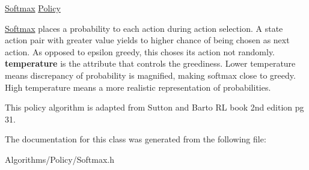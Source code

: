 \hyperlink{classAI_1_1Algorithm_1_1Softmax}{Softmax} \hyperlink{classAI_1_1Algorithm_1_1Policy}{Policy} 

\hyperlink{classAI_1_1Algorithm_1_1Softmax}{Softmax} places a probability to each action during action selection. A state action pair with greater value yields to higher chance of being chosen as next action. As opposed to epsilon greedy, this choses its action not randomly. {\bfseries temperature} is the attribute that controls the greediness. Lower temperature means discrepancy of probability is magnified, making softmax close to greedy. High temperature means a more realistic representation of probabilities. 

This policy algorithm is adapted from Sutton and Barto R\-L book 2nd edition pg 31. 

The documentation for this class was generated from the following file\-:\begin{DoxyCompactItemize}
\item 
Algorithms/\-Policy/Softmax.\-h\end{DoxyCompactItemize}
